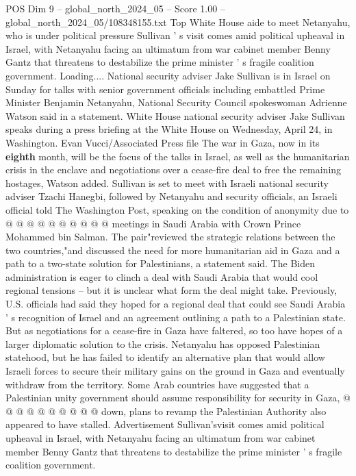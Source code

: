 \begin{textsample}{POS Dim 9 – global\_north\_2024\_05 – Score 1.00 – global\_north\_2024\_05/108348155.txt}  \label{ex:f9_pos_292}
Top White House aide to meet Netanyahu, who is under political pressure Sullivan ' s visit comes amid political upheaval in Israel, with Netanyahu facing an ultimatum from war cabinet member Benny Gantz that threatens to destabilize the prime minister ' s fragile coalition government.
Loading....
National security adviser Jake Sullivan is in Israel on Sunday for talks with senior government officials including embattled Prime Minister Benjamin Netanyahu, National Security Council spokeswoman Adrienne Watson said in a statement.
White House national security adviser Jake Sullivan speaks during a press briefing at the White House on Wednesday, April 24, in Washington.
Evan Vucci/Associated Press file The war in Gaza, now in its \textbf{eighth} month, will be the focus of the talks in Israel, as well as the humanitarian crisis in the enclave and negotiations over a cease-fire deal to free the remaining hostages, Watson added.
Sullivan is set to meet with Israeli national security adviser Tzachi Hanegbi, followed by Netanyahu and security officials, an Israeli official told The Washington Post, speaking on the condition of anonymity due to @ @ @ @ @ @ @ @ @ @ meetings in Saudi Arabia with Crown Prince Mohammed bin Salman.
The pair"reviewed the strategic relations between the two countries,"and discussed the need for more humanitarian aid in Gaza and a path to a two-state solution for Palestinians, a statement said.
The Biden administration is eager to clinch a deal with Saudi Arabia that would cool regional tensions -- but it is unclear what form the deal might take.
Previously, U.S. officials had said they hoped for a regional deal that could see Saudi Arabia ' s recognition of Israel and an agreement outlining a path to a Palestinian state.
But as negotiations for a cease-fire in Gaza have faltered, so too have hopes of a larger diplomatic solution to the crisis.
Netanyahu has opposed Palestinian statehood, but he has failed to identify an alternative plan that would allow Israeli forces to secure their military gains on the ground in Gaza and eventually withdraw from the territory.
Some Arab countries have suggested that a Palestinian unity government should assume responsibility for security in Gaza, @ @ @ @ @ @ @ @ @ @ down, plans to revamp the Palestinian Authority also appeared to have stalled.
Advertisement Sullivan'svisit comes amid political upheaval in Israel, with Netanyahu facing an ultimatum from war cabinet member Benny Gantz that threatens to destabilize the prime minister ' s fragile coalition government.

\end{textsample}
